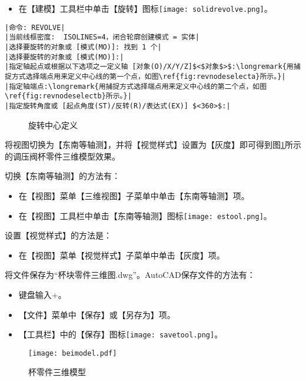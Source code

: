 \begin{procedure}
\begin{itemize}
\item 在【建模】工具栏中单击【旋转】图标\texttt{[image: solidrevolve.png]}。
\end{itemize}
\begin{lstlisting}
|命令: REVOLVE|
|当前线框密度:  ISOLINES=4，闭合轮廓创建模式 = 实体|
|选择要旋转的对象或 [模式(MO)]: 找到 1 个|
|选择要旋转的对象或 [模式(MO)]:|
|指定轴起点或根据以下选项之一定义轴 [对象(O)/X/Y/Z]$<$对象$>$:\longremark{用捕捉方式选择端点用来定义中心线的第一个点，如图\ref{fig:revnodeselecta}所示。}|
|指定轴端点:\longremark{用捕捉方式选择端点用来定义中心线的第二个点，如图\ref{fig:revnodeselectb}所示。}|
|指定旋转角度或 [起点角度(ST)/反转(R)/表达式(EX)] $<360>$:|
\end{lstlisting}
\showremarks
\begin{figure}[htbp]
\centering
{}\hspace{30pt}
\caption{旋转中心定义}
\end{figure}
\item 将视图切换为【东南等轴测】，并将【视觉样式】设置为【灰度】即可得到图\ref{fig:beimodel}所示的调压阀杯零件三维模型效果。

切换【东南等轴测】的方法有：
\begin{itemize}
\item 在【视图】菜单【三维视图】子菜单中单击【东南等轴测】项。
\item 在【视图】工具栏中单击【东南等轴测】图标\texttt{[image: estool.png]}。
\end{itemize}
设置【视觉样式】的方法是：
\begin{itemize}
\item 在【视图】菜单【视觉样式】子菜单中单击【灰度】项。
\end{itemize}
\item 将文件保存为“杯块零件三维图.dwg”。AutoCAD保存文件的方法有：
\begin{itemize}
\item 键盘输入+。
\item 【文件】菜单中【保存】或【另存为】项。
\item 【工具栏】中的【保存】图标\texttt{[image: savetool.png]}。
\end{itemize}
\end{procedure}
\begin{figure}
\centering
\texttt{[image: beimodel.pdf]}
\caption{杯零件三维模型}\label{fig:beimodel}
\end{figure}

